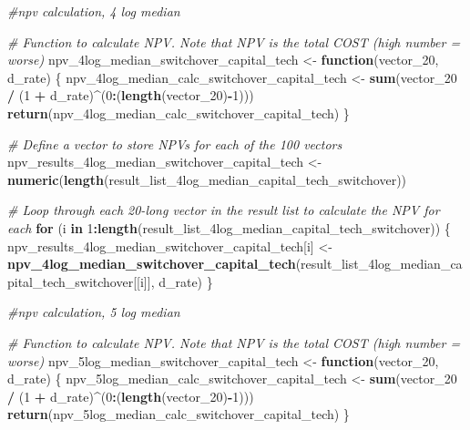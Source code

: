 \documentclass[
]{article}
\newenvironment{Shaded}{\begin{snugshade}}{\end{snugshade}}
\newcommand{\CommentTok}[1]{\textcolor[rgb]{0.56,0.35,0.01}{\textit{#1}}}
\newcommand{\ControlFlowTok}[1]{\textcolor[rgb]{0.13,0.29,0.53}{\textbf{#1}}}
\newcommand{\DecValTok}[1]{\textcolor[rgb]{0.00,0.00,0.81}{#1}}
\newcommand{\FunctionTok}[1]{\textcolor[rgb]{0.13,0.29,0.53}{\textbf{#1}}}
\newcommand{\NormalTok}[1]{#1}
\newcommand{\OtherTok}[1]{\textcolor[rgb]{0.56,0.35,0.01}{#1}}
\newcommand{\SpecialCharTok}[1]{\textcolor[rgb]{0.81,0.36,0.00}{\textbf{#1}}}
\begin{document}
\begin{Shaded}
\begin{Highlighting}[]
\CommentTok{\#npv calculation, 4 log median}


\CommentTok{\# Function to calculate NPV. Note that NPV is the total COST (high number = worse)}
\NormalTok{npv\_4log\_median\_switchover\_capital\_tech }\OtherTok{\textless{}{-}} \ControlFlowTok{function}\NormalTok{(vector\_20, d\_rate) \{}
\NormalTok{  npv\_4log\_median\_calc\_switchover\_capital\_tech }\OtherTok{\textless{}{-}} \FunctionTok{sum}\NormalTok{(vector\_20 }\SpecialCharTok{/}\NormalTok{ (}\DecValTok{1} \SpecialCharTok{+}\NormalTok{ d\_rate)}\SpecialCharTok{\^{}}\NormalTok{(}\DecValTok{0}\SpecialCharTok{:}\NormalTok{(}\FunctionTok{length}\NormalTok{(vector\_20)}\SpecialCharTok{{-}}\DecValTok{1}\NormalTok{)))}
  \FunctionTok{return}\NormalTok{(npv\_4log\_median\_calc\_switchover\_capital\_tech)}
\NormalTok{\}}

\CommentTok{\# Define a vector to store NPVs for each of the 100 vectors}
\NormalTok{npv\_results\_4log\_median\_switchover\_capital\_tech }\OtherTok{\textless{}{-}} \FunctionTok{numeric}\NormalTok{(}\FunctionTok{length}\NormalTok{(result\_list\_4log\_median\_capital\_tech\_switchover))}

\CommentTok{\# Loop through each 20{-}long vector in the result list to calculate the NPV for each}
\ControlFlowTok{for}\NormalTok{ (i }\ControlFlowTok{in} \DecValTok{1}\SpecialCharTok{:}\FunctionTok{length}\NormalTok{(result\_list\_4log\_median\_capital\_tech\_switchover)) \{}
\NormalTok{  npv\_results\_4log\_median\_switchover\_capital\_tech[i] }\OtherTok{\textless{}{-}} \FunctionTok{npv\_4log\_median\_switchover\_capital\_tech}\NormalTok{(result\_list\_4log\_median\_capital\_tech\_switchover[[i]], d\_rate)}
\NormalTok{\}}


\CommentTok{\#npv calculation, 5 log median}


\CommentTok{\# Function to calculate NPV. Note that NPV is the total COST (high number = worse)}
\NormalTok{npv\_5log\_median\_switchover\_capital\_tech }\OtherTok{\textless{}{-}} \ControlFlowTok{function}\NormalTok{(vector\_20, d\_rate) \{}
\NormalTok{  npv\_5log\_median\_calc\_switchover\_capital\_tech }\OtherTok{\textless{}{-}} \FunctionTok{sum}\NormalTok{(vector\_20 }\SpecialCharTok{/}\NormalTok{ (}\DecValTok{1} \SpecialCharTok{+}\NormalTok{ d\_rate)}\SpecialCharTok{\^{}}\NormalTok{(}\DecValTok{0}\SpecialCharTok{:}\NormalTok{(}\FunctionTok{length}\NormalTok{(vector\_20)}\SpecialCharTok{{-}}\DecValTok{1}\NormalTok{)))}
  \FunctionTok{return}\NormalTok{(npv\_5log\_median\_calc\_switchover\_capital\_tech)}
\NormalTok{\}}


\end{Highlighting}
\end{Shaded}
\end{document}
